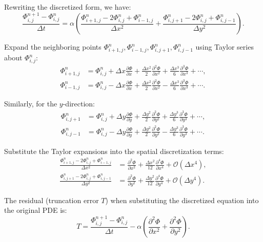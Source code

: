 \documentclass{article}
\begin{document}
Rewriting the discretized form, we have:
\begin{equation}
\frac{\Phi_{i,j}^{n+1} - \Phi_{i,j}^n}{\Delta t} = \alpha \left( \frac{\Phi_{i+1,j}^n - 2\Phi_{i,j}^n + \Phi_{i-1,j}^n}{\Delta x^2} + \frac{\Phi_{i,j+1}^n - 2\Phi_{i,j}^n + \Phi_{i,j-1}^n}{\Delta y^2} \right).
\end{equation}

Expand the neighboring points \( \Phi_{i+1,j}^n, \Phi_{i-1,j}^n, \Phi_{i,j+1}^n, \Phi_{i,j-1}^n \) using Taylor series about \( \Phi_{i,j}^n \):
\begin{align}
\Phi_{i+1,j}^n &= \Phi_{i,j}^n + \Delta x \frac{\partial \Phi}{\partial x} + \frac{\Delta x^2}{2} \frac{\partial^2 \Phi}{\partial x^2} + \frac{\Delta x^3}{6} \frac{\partial^3 \Phi}{\partial x^3} + \cdots, \\
\Phi_{i-1,j}^n &= \Phi_{i,j}^n - \Delta x \frac{\partial \Phi}{\partial x} + \frac{\Delta x^2}{2} \frac{\partial^2 \Phi}{\partial x^2} - \frac{\Delta x^3}{6} \frac{\partial^3 \Phi}{\partial x^3} + \cdots.
\end{align}

Similarly, for the \( y \)-direction:
\begin{align}
\Phi_{i,j+1}^n &= \Phi_{i,j}^n + \Delta y \frac{\partial \Phi}{\partial y} + \frac{\Delta y^2}{2} \frac{\partial^2 \Phi}{\partial y^2} + \frac{\Delta y^3}{6} \frac{\partial^3 \Phi}{\partial y^3} + \cdots, \\
\Phi_{i,j-1}^n &= \Phi_{i,j}^n - \Delta y \frac{\partial \Phi}{\partial y} + \frac{\Delta y^2}{2} \frac{\partial^2 \Phi}{\partial y^2} - \frac{\Delta y^3}{6} \frac{\partial^3 \Phi}{\partial y^3} + \cdots.
\end{align}

Substitute the Taylor expansions into the spatial discretization terms:
\begin{align}
\frac{\Phi_{i+1,j}^n - 2\Phi_{i,j}^n + \Phi_{i-1,j}^n}{\Delta x^2} &= \frac{\partial^2 \Phi}{\partial x^2} + \frac{\Delta x^2}{12} \frac{\partial^4 \Phi}{\partial x^4} + \mathcal{O}(\Delta x^4), \\
\frac{\Phi_{i,j+1}^n - 2\Phi_{i,j}^n + \Phi_{i,j-1}^n}{\Delta y^2} &= \frac{\partial^2 \Phi}{\partial y^2} + \frac{\Delta y^2}{12} \frac{\partial^4 \Phi}{\partial y^4} + \mathcal{O}(\Delta y^4).
\end{align}

The residual (truncation error \( T \)) when substituting the discretized equation into the original PDE is:
\begin{equation}
T = \frac{\Phi_{i,j}^{n+1} - \Phi_{i,j}^n}{\Delta t} - \alpha \left( \frac{\partial^2 \Phi}{\partial x^2} + \frac{\partial^2 \Phi}{\partial y^2} \right).
\end{equation}
\end{document}
